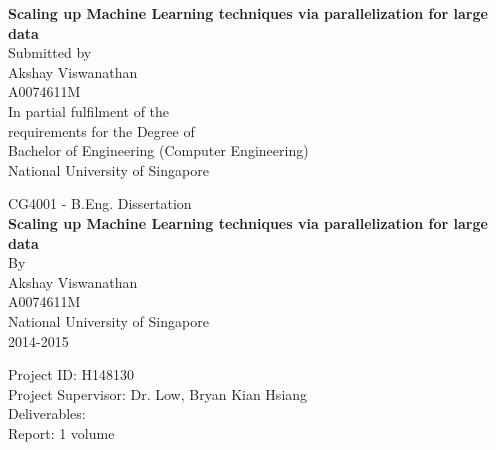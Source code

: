 \documentclass[12pt]{article}
\begin{document}
\begin{titlepage}
\begin{centering}
\large
\vspace{1 cm}
\Large \textbf{Scaling up Machine Learning techniques via parallelization for large data} \vspace{5 cm} \large \\
Submitted by \\ \vspace{.5cm}
Akshay Viswanathan \\
A0074611M \\
\vspace{2 cm} 
\vspace{5cm}
\hspace{-0.6cm}
In partial fulfilment of the\\
requirements for the Degree of\\
Bachelor of Engineering (Computer Engineering)\\
National University of Singapore \\
\end{centering}
\end{titlepage}
\newpage
\renewcommand{\baselinestretch}{1.50}\normalsize
\begin{titlepage}
\begin{centering}
\large
  CG4001 - B.Eng. Dissertation\\
\vspace{1 cm}
\Large 
\textbf{Scaling up Machine Learning techniques via parallelization for large data} 
\vspace{2 cm}
\large \\
\vspace{4 cm}
By \\ \vspace{.5cm}
Akshay Viswanathan \\
A0074611M \\
National University of Singapore\\
2014-2015\\
\vspace{4 cm} 
\end{centering}
\hspace{-0.6cm}Project  ID: H148130\\
Project Supervisor: Dr. Low, Bryan Kian Hsiang\\
Deliverables:\\
\-\hspace{2cm} Report: 1 volume
\end{titlepage}
\newpage
{}
\end{document}
